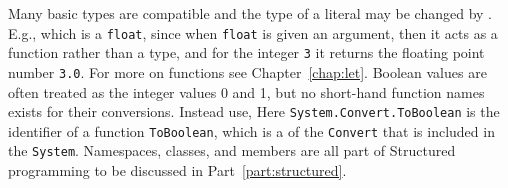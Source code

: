 Many basic types are compatible and the type of a literal may be changed by . E.g.,
%
which is a \lstinline!float!, since when \lstinline|float| is given an argument, then it acts as a function rather than a type, and for the integer \lstinline|3| it returns the floating point number \lstinline|3.0|.  For more on functions see Chapter~\ref{chap:let}. Boolean values are often treated as the integer values 0 and 1, but no short-hand function names exists for their conversions. Instead use,
%
Here \lstinline|System.Convert.ToBoolean| is the identifier of a function \lstinline|ToBoolean|, which is a  of the  \lstinline|Convert| that is included in the  \lstinline|System|. Namespaces, classes, and members are all part of Structured programming to be discussed in Part~\ref{part:structured}.

